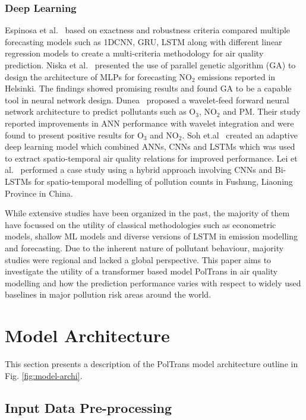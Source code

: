 \documentclass[twocolumn]{svjour3}          %
\begin{document}
\subsubsection{Deep Learning} Espinosa et al.~\cite{Espinosa.2021} based on exactness and robustness criteria compared multiple forecasting models such as 1DCNN, GRU, LSTM along with different linear regression models to create a multi-criteria methodology for air quality prediction. Niska et al.~\cite{Niska.2004} presented the use of parallel genetic algorithm (GA) to design the architecture of MLPs for forecasting NO${_2}$ emissions reported in Helsinki. The findings showed promising results and found GA to be a capable tool in neural network design. Dunea~\cite{Dunea.2015} proposed a wavelet-feed forward neural network architecture to predict pollutants such as O${_3}$, NO${_2}$ and PM. Their study reported improvements in ANN performance with wavelet integration and were found to present positive results for O${_3}$ and NO${_2}$. Soh et.al~\cite{Soh.2018} created an adaptive deep learning model which combined ANNs, CNNs and LSTMs which was used to extract spatio-temporal air quality relations for improved performance. Lei et al.~\cite{Lei.2020} performed a case study using a hybrid approach involving CNNs and Bi-LSTMs for spatio-temporal modelling of pollution counts in Fushung, Liaoning Province in China.

While extensive studies have been organized in the past, the majority of them have focussed on the utility of classical methodologies such as econometric models, shallow ML models and diverse versions of LSTM in emission modelling and forecasting. Due to the inherent nature of pollutant behaviour, majority studies were regional and lacked a global perspective. This paper aims to investigate the utility of a transformer based model {PolTrans} in air quality modelling and how the prediction performance varies with respect to widely used baselines in major pollution risk areas around the world.


\section{Model Architecture}
\label{sec:model-archi}

This section presents a description of the {PolTrans} model architecture outline in Fig. \ref{fig:model-archi}.

\subsection{Input Data Pre-processing}
\end{document}
